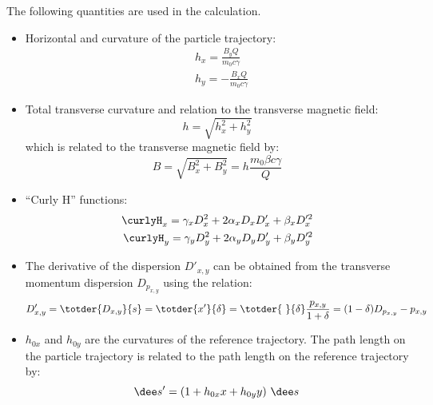 The following quantities are used in the calculation.
\begin{itemize}
\item Horizontal and curvature of the particle trajectory:
\begin{align}
    &h_x = \frac{B_y Q}{m_0 c \gamma}    \label{eq:curvx}\\
    &h_y = -\frac{B_x Q}{m_0 c \gamma}   \label{eq:curvy}
\end{align}
\item Total transverse curvature and relation to the transverse magnetic field:
\begin{equation}
    h = \sqrt{h_x^2 + h_y^2}
\end{equation}
which is related to the transverse magnetic field by:
\begin{equation}
    B = \sqrt{B_x^2 + B_y^2}  = h  \frac{m_0 \beta c \gamma}{Q}
    \label{eq:btocurv}
\end{equation}
\item ``Curly H'' functions:
\begin{align}
    \curlyH_x = \gamma_x D_x^2 + 2 \alpha_x D_x D_x' + \beta_x D_x'^2\\
    \curlyH_y = \gamma_y D_y^2 + 2 \alpha_y D_y D_y' + \beta_y D_y'^2
\end{align}
\item The derivative of the dispersion $D'_{x,y}$ can be obtained from the transverse
momentum dispersion $D_{p_{x,y}}$ using the relation:
\begin{equation}
    D'_{x,y} = \totder{D_{x,y}}{s} = \totder{x'}{\delta} =
      \totder{~}{\delta} \frac{p_{x,y}}{1+\delta} = (1 - \delta)D_{p_{x,y}} - p_{x,y}
    \label{eq:ddispder}
\end{equation}
\item $h_{0x}$ and $h_{0y}$ are the curvatures of the reference trajectory. The path
length on the particle trajectory is related to the path length on the reference trajectory by:
\begin{equation}
    \dee s' = (1 + h_{0x}x + h_{0y}y)\ \dee s
    \label{eq:pathlength}
\end{equation}
\end{itemize}

